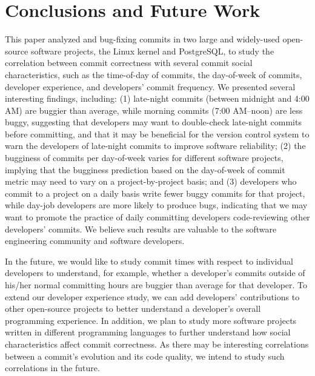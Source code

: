 \section{Conclusions and Future Work}
\label{sec-conclusion}

This paper analyzed \linuxBFC and \postBFC bug-fixing commits in two large and
widely-used open-source software projects, the Linux kernel and PostgreSQL, 
to study the correlation between commit correctness with several
commit social characteristics, such as the time-of-day of commits, the
day-of-week of commits, developer experience, and developers' commit 
frequency. We presented several interesting findings, including: (1) late-night
commits (between midnight and 4:00 AM) are buggier than average, while morning
commits (7:00 AM--noon) are less buggy, suggesting that developers may want to
double-check late-night commits before committing, and that it may be beneficial
for the version control system to warn the developers of late-night commits to
improve software reliability; (2) the bugginess of commits
per day-of-week varies for different software projects, implying that the
bugginess prediction based on the day-of-week of commit metric may need to vary
on a project-by-project basis; and (3) developers who commit to a project on a
daily basis write fewer buggy commits for that project, while day-job developers
are more likely to produce bugs, indicating that we may want to promote the
practice of daily committing developers code-reviewing other developers'
commits. We believe such results are valuable to the software engineering
community and software developers.

In the future, we would like to study commit times with respect to individual
developers to understand, for example, whether a developer's commits outside of
his/her normal committing hours are buggier than average for that developer. To
extend our developer experience study, we can add developers' contributions to
other open-source projects to better understand a developer's overall
programming experience. In addition, we plan to study more software projects
written in different programming languages to further understand how social
characteristics affect commit correctness. As there may be interesting
correlations between a commit's evolution and its code quality, we intend to
study such correlations in the future.


